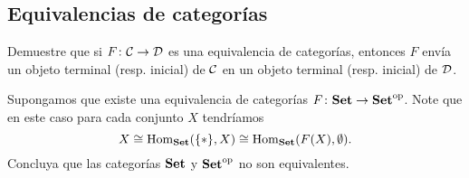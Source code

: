 \subsection*{Equivalencias de categorías}

\begin{ejerc}
  Demuestre que si $F\colon \mathcal{C}\to \mathcal{D}$ es una equivalencia de
  categorías, entonces $F$ envía un objeto terminal (resp. inicial) de
  $\mathcal{C}$ en un objeto terminal (resp. inicial) de $\mathcal{D}$.

  Supongamos que existe una equivalencia de categorías
  $F\colon \text{\bf Set}\to \text{\bf Set}^\mathrm{op}$. Note que en este caso para
  cada conjunto $X$ tendríamos
  $$X \cong \operatorname{Hom}_{\text{\bf Set}} (\{ \ast \},X) \cong
            \operatorname{Hom}_{\text{\bf Set}} (F (X), \emptyset).$$
  Concluya que las categorías $\text{\bf Set}$ y $\text{\bf Set}^\mathrm{op}$ no son
  equivalentes.
\end{ejerc}